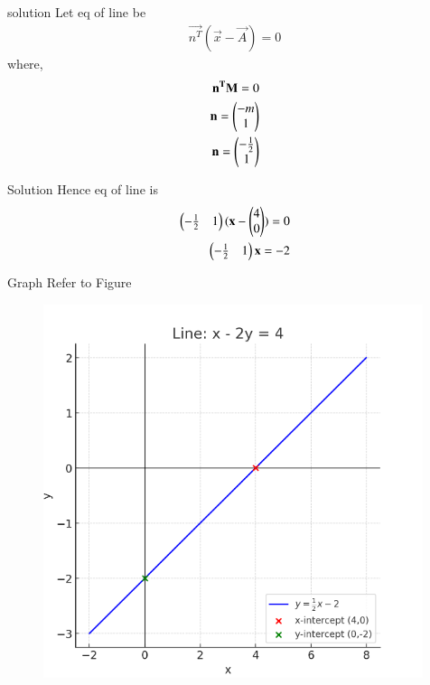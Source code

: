 \documentclass{beamer}
\begin{document}
\begin{frame}{solution}
Let eq of line be
\begin{align}
\vec{n^T}(\vec{x}-\vec{A})=0
\end{align}
where,
\begin{align}
\mathbf{n^T}\mathbf{M}=0\\
\mathbf{n}=\begin{pmatrix}-m
               \\
               1\end{pmatrix}\\
\mathbf{n}=\begin{pmatrix}-\frac{1}{2}
                \\
                1\end{pmatrix}
\end{align}

\end{frame}
\begin{frame}{Solution}
Hence eq of line is
\begin{align}
\begin{pmatrix}-\frac{1}{2}&1\end{pmatrix}
(\mathbf{x}-    
\begin{pmatrix}
           4
           \\
            0
               \end{pmatrix}   )
=0\\
\begin{pmatrix}-\frac{1}{2}&1\end{pmatrix}\mathbf{x}
=-2
\end{align}
\end{frame}
\begin{frame}{Graph}
   Refer to Figure

\begin{figure}[H]
\begin{center}
\includegraphics[width=0.6\columnwidth]{../figs/graphb.png}
\end{center}
\caption{}
\label{fig:Fig}
\end{figure}  
\end{frame}
\end{document}
